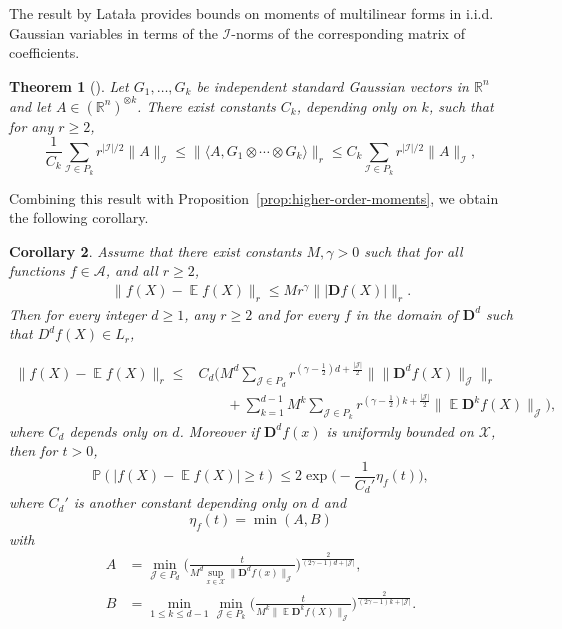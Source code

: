 \documentclass[a4paper]{amsart}
\newtheorem{theorem}{Theorem}[section]
\newtheorem{corollary}[theorem]{Corollary} %
\theoremstyle{definition}
\theoremstyle{remark}
\numberwithin{equation}{section}
\newcommand*{\RR}{\mathbb{R}}
\DeclareMathOperator{\EE}{\mathbb{E}} %
\newcommand*{\PP}{\mathbb{P}} %
\begin{document}
The result by Latała provides bounds on moments of multilinear forms in i.i.d. Gaussian variables in terms of the $\mathcal{I}$-norms of the corresponding matrix of coefficients.

\begin{theorem}[\cite{MR2294983}]\label{thm:Latala} Let $G_1,\ldots,G_k$ be independent standard Gaussian vectors in $\RR^n$ and let $A \in (\RR^n)^{\otimes k}$. There exist constants $C_k$, depending only on $k$, such that  for any $r\ge 2$,
\begin{displaymath}
  \frac{1}{C_k} \sum_{\mathcal{I}\in P_k} r^{|\mathcal{I}|/2}\|A\|_\mathcal{I} \le \|\langle A,G_1\otimes\cdots\otimes G_k\rangle\|_r\le C_k\sum_{\mathcal{I}\in P_k} r^{|\mathcal{I}|/2}\|A\|_\mathcal{I},
\end{displaymath}
\end{theorem}

Combining this result with Proposition~\ref{prop:higher-order-moments}, we obtain the following corollary.

\begin{corollary}\label{cor:higher-order-tails}
   Assume that there exist constants $M,\gamma > 0$ such  that for all functions $f \in \mathcal{A}$, and all $r \ge 2$,
   \begin{align}\label{eq:momen-assumption}
     \| f(X) - \EE f(X)\|_r \le M r^{\gamma} \Big\||\mathbf{D} f(X)|\Big\|_r.
   \end{align}
   Then for every integer $d \ge 1$, any $r \ge 2$ and for every $f$ in the domain of $\mathbf{D}^d$ such that $D^df(X)\in L_r$,

\begin{align*}
\|f(X) - \EE f(X)\|_r \le& C_d\Big(M^d\sum_{\mathcal{J} \in P_d} r^{(\gamma - \frac{1}{2})d + \frac{|\mathcal{J}|}{2}} \Big\|\|\mathbf{D}^d f(X)\|_\mathcal{J}\Big\|_r\\
&\qquad+ \sum_{k=1}^{d-1} M^k \sum_{\mathcal{J}\in P_k} r^{(\gamma -
\frac{1}{2})k  + \frac{|\mathcal{J}|}{2}} \|\EE \mathbf{D}^k f(X)\|_\mathcal{J}\Big),
\end{align*}
where $C_d$ depends only on $d$. Moreover if $\mathbf{D}^df (x)$ is uniformly bounded on $\mathcal{X}$, then
for $t > 0$,
\begin{displaymath}
\PP(|f(X) - \EE f(X)| \ge t ) \le 2\exp\Big(-\frac{1}{C_d'} \eta_f(t)\Big),
\end{displaymath}
where $C_d'$ is another constant depending only on $d$ and
\begin{displaymath}
  \eta_f(t) = \min(A,B)
\end{displaymath}
with
\begin{align*}
A & =  \min_{\mathcal{J}\in P_d}\Big(\frac{t}{M^{d}\sup_{x\in \mathcal{X}}\|\mathbf{D}^d f(x)\|_\mathcal{J}}\Big)^{\frac{2}{(2\gamma-1)d+ |\mathcal{J}|}},\\
B & = \min_{1\le k\le d-1}\min_{\mathcal{J}\in P_k} \Big(\frac{t}{M^{k}\|\EE \mathbf{D}^k f(X)\|_\mathcal{J}}\Big)^{\frac{2}{(2\gamma -1)k + |\mathcal{J}|}}.
\end{align*}
\end{corollary}
\end{document}
